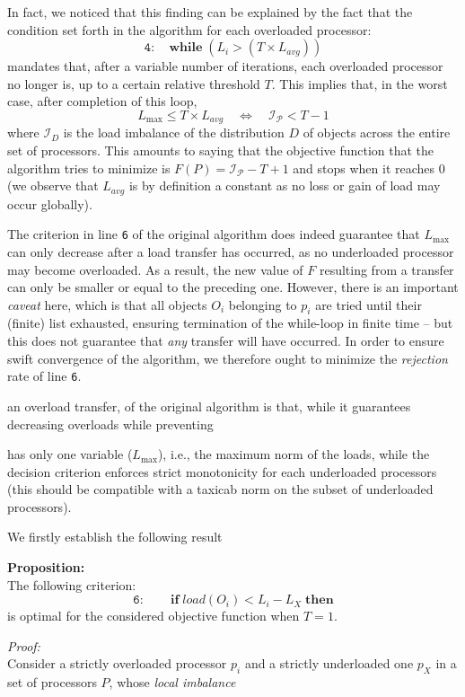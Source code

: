 In fact, we noticed that this finding can be explained by the fact
that the condition set forth in the algorithm for each overloaded
processor:
\[
\mathtt{4:} \quad \mathrm{\mathbf{while}} \; (L_i > (T \times L_{avg}))
\]
mandates that, after a variable number of iterations, each overloaded
processor no longer is, up to a certain relative threshold $T$.
This implies that, in the worst case, after completion of this loop,
\begin{equation}
\label{eq:imbalance}
L_{\max} \le T \times L_{avg}
\quad \Longleftrightarrow \quad
\mathcal{I_P} < T - 1
\end{equation}
where $\mathcal{I}_D$ is the load imbalance of the distribution $D$ of
objects across the entire set of processors. This amounts to
saying that the objective function 
that the algorithm tries to minimize is $F(P)=\mathcal{I_P}-T+1$ and
stops when it reaches 0 (we observe that $L_{avg}$ is by definition a
constant as no loss or gain of load may occur globally).

The criterion in line \texttt{6} of the original algorithm does indeed
guarantee that $L_{\max}$ can only decrease after a load transfer has
occurred, as no underloaded processor may become overloaded. As a
result, the new value of $F$ resulting from a transfer can only be
smaller or equal to the preceding one.
However, there is an important \emph{caveat} here, which is that all
objects $O_i$ belonging to $p_i$ are tried until their (finite) list
exhausted, ensuring termination of the while-loop in finite time --
but this does not guarantee that \emph{any} transfer will have
occurred. In order to ensure swift convergence of the algorithm, we
therefore ought to minimize the \emph{rejection} rate of line
\texttt{6}. 

an overload transfer,  of the original algorithm is that,
while it guarantees decreasing overloads while preventing 

has only one variable ($L_{\max}$), i.e., the maximum norm of the
loads, while the decision criterion enforces strict monotonicity for
each underloaded processors (this should be compatible with a
taxicab norm on the subset of underloaded processors).

We firstly establish the following result
\par\textbf{Proposition:}\\
The following criterion:
\[
\mathtt{6:} \qquad \mathrm{\mathbf{if}} \; load(O_i) < L_i - L_X
\; \mathrm{\mathbf{then}}
\]
is optimal for the considered objective function when $T=1$.
\par\textit{Proof:}\\
Consider a strictly overloaded processor $p_i$ and a strictly
underloaded one $p_X$ in a set of processors $P$, whose \emph{local
imbalance} 

